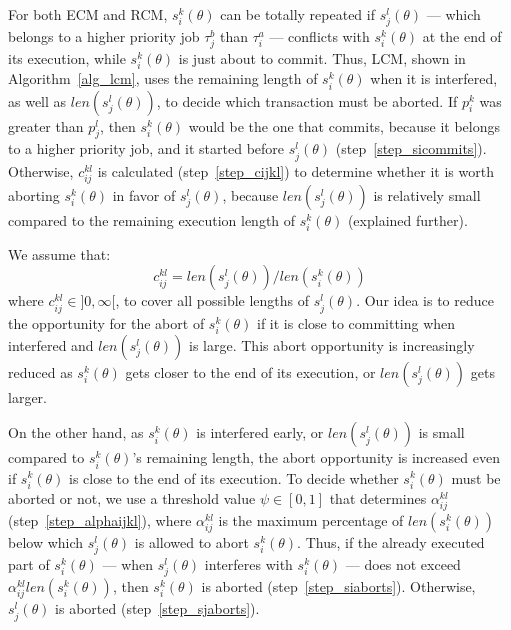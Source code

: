 \documentclass{sig-alternate}
\begin{document}
For both ECM and RCM, $s_{i}^{k}(\theta)$ can be totally repeated if $s_{j}^{l}(\theta)$ --- which belongs to a higher priority job $\tau_{j}^b$ than $\tau_{i}^a$ --- conflicts with $s_{i}^{k}(\theta)$
at the end of its execution, while $s_{i}^{k}(\theta)$ is just about
to commit. Thus, LCM, shown in Algorithm~\ref{alg_lcm}, uses the remaining length of $s_{i}^{k}(\theta)$ when it is interfered,
as well as $len(s_{j}^{l}(\theta))$, to decide which transaction must be aborted. If $p_i^k$ was greater than $p_j^l$, then $s_i^k(\theta)$ would be the one that commits, because it belongs to a higher priority job, and it started before $s_j^l(\theta)$ (step~\ref{step_sicommits}). Otherwise, $c_{ij}^{kl}$ is calculated (step~\ref{step_cijkl}) to determine whether it is worth aborting $s_i^k(\theta)$ in favor of $s_j^l(\theta)$, because $len(s_j^l(\theta))$ is relatively small compared to the remaining execution length of $s_i^k(\theta)$  (explained further).

We assume that:
\begin{equation}
c_{ij}^{kl}=len(s_{j}^{l}(\theta))/len(s_{i}^{k}(\theta))
\label{cm_eq}\end{equation}
where $c_{ij}^{kl}\in]0,\infty[$, to cover all possible lengths of $s_{j}^{l}(\theta)$.
Our idea is to reduce the opportunity for the abort of $s_{i}^{k}(\theta)$ if it is close to committing when interfered and $len(s_{j}^{l}(\theta))$ is large. This abort opportunity is increasingly reduced as $s_{i}^{k}(\theta)$ gets closer to the end of its execution, or $len(s_{j}^{l}(\theta))$ gets larger. 

On the other hand, as $s_{i}^{k}(\theta)$ is interfered early,
or $len(s_{j}^{l}(\theta))$ is small compared to $s_{i}^{k}(\theta)$'s remaining length, the abort opportunity 
is increased even if $s_i^k (\theta)$ is close to the end of its execution. To decide whether $s_{i}^{k}(\theta)$ must be aborted or not, we use a threshold value $\psi\in[0,1]$ that determines $\alpha_{ij}^{kl}$ (step~\ref{step_alphaijkl}), where $\alpha_{ij}^{kl}$ is the maximum percentage of $len(s_i^k(\theta))$ below which $s_j^l(\theta)$ is allowed to abort $s_i^k(\theta)$. Thus, if the already executed part of $s_i^k(\theta)$ --- when $s_j^l(\theta)$ interferes with $s_i^k(\theta)$ --- does not exceed $\alpha_{ij}^{kl}len(s_i^k(\theta))$, then $s_i^k(\theta)$ is aborted (step~\ref{step_siaborts}). Otherwise, $s_j^l(\theta)$ is aborted (step~\ref{step_sjaborts}).
\end{document}
